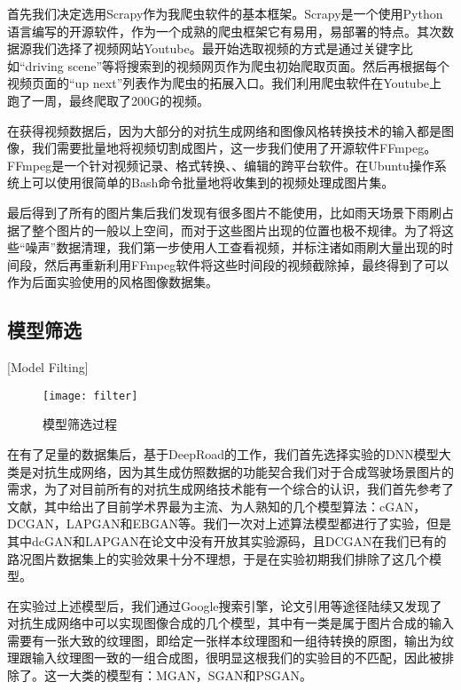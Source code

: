 首先我们决定选用Scrapy作为我爬虫软件的基本框架。Scrapy是一个使用Python语言编写的开源软件，作为一个成熟的爬虫框架它有易用，易部署的特点。其次数据源我们选择了视频网站Youtube。最开始选取视频的方式是通过关键字比如“driving scene”等将搜索到的视频网页作为爬虫初始爬取页面。然后再根据每个视频页面的“up next”列表作为爬虫的拓展入口。我们利用爬虫软件在Youtube上跑了一周，最终爬取了200G的视频。

在获得视频数据后，因为大部分的对抗生成网络和图像风格转换技术的输入都是图像，我们需要批量地将视频切割成图片，这一步我们使用了开源软件FFmpeg。FFmpeg是一个针对视频记录、格式转换、、编辑的跨平台软件。在Ubuntu操作系统上可以使用很简单的Bash命令批量地将收集到的视频处理成图片集。

最后得到了所有的图片集后我们发现有很多图片不能使用，比如雨天场景下雨刷占据了整个图片的一般以上空间，而对于这些图片出现的位置也极不规律。为了将这些“噪声”数据清理，我们第一步使用人工查看视频，并标注诸如雨刷大量出现的时间段，然后再重新利用FFmpeg软件将这些时间段的视频截除掉，最终得到了可以作为后面实验使用的风格图像数据集。

\subsection{模型筛选}[Model Filting]

\begin{figure}[t]
    \centering
    \texttt{[image: filter]}
    \caption{模型筛选过程}
    \label{fig:filtering}
\end{figure}

在有了足量的数据集后，基于DeepRoad的工作，我们首先选择实验的DNN模型大类是对抗生成网络\cite{GAN}，因为其生成仿照数据的功能契合我们对于合成驾驶场景图片的需求，为了对目前所有的对抗生成网络技术能有一个综合的认识，我们首先参考了文献\cite{gan-survey}，其中给出了目前学术界最为主流、为人熟知的几个模型算法：cGAN\cite{cGAN}，DCGAN\cite{dcgan}，LAPGAN\cite{LAPGAN}和EBGAN\cite{ebgan}等。我们一次对上述算法模型都进行了实验，但是其中dcGAN和LAPGAN在论文中没有开放其实验源码，且DCGAN在我们已有的路况图片数据集上的实验效果十分不理想，于是在实验初期我们排除了这几个模型。

在实验过上述模型后，我们通过Google搜索引擎，论文引用等途径陆续又发现了对抗生成网络中可以实现图像合成的几个模型，其中有一类是属于图片合成的输入需要有一张大致的纹理图，即给定一张样本纹理图和一组待转换的原图，输出为纹理跟输入纹理图一致的一组合成图，很明显这根我们的实验目的不匹配，因此被排除了。这一大类的模型有：MGAN\cite{MGAN}，SGAN\cite{SGAN}和PSGAN\cite{PSGAN}。

